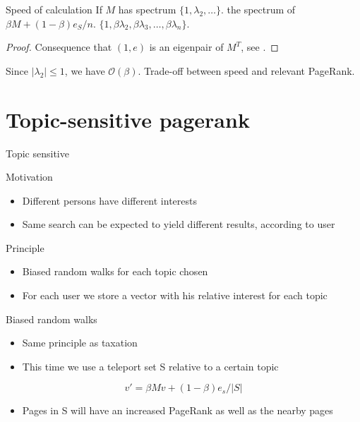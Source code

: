 \documentclass[10pt]{beamer}
\newcommand\bigoh{\mathcal{O}}
\begin{document}
\begin{frame}
  \begin{block}{Speed of calculation \cite[p.~12]{langville2004deeper}}
    If $M$ has spectrum $\{1,\lambda_2,\ldots\}$.
    the spectrum of $\beta M + (1-\beta)e_S/n$.
    $\{1,\beta\lambda_2,\beta\lambda_3,\ldots,\beta\lambda_n\}$.
    \begin{proof}
      Consequence that $(1,e)$ is an eigenpair of $M^T$,
      see \cite[p.~12]{langville2004deeper}.
    \end{proof}
  \end{block}
  Since $|\lambda_2| \leq 1$, we have $\bigoh(\beta)$.
  Trade-off between speed and relevant PageRank.
\end{frame}
\section{Topic-sensitive pagerank}
\begin{frame}[allowframebreaks]{Topic sensitive}
  \begin{block}{Motivation}
  \begin{itemize}
  \item Different persons have different interests
  \item Same search can be expected to yield different results, according to user
  \end{itemize}
  \end{block}
  \begin{block}{Principle}
  \begin{itemize}
  \item Biased random walks for each topic chosen
  \item For each user we store a vector with his relative interest for each topic
  \end{itemize}
  \end{block}
  \framebreak
  \begin{block}{Biased random walks}
    \begin{itemize}
      \item Same principle as taxation
      \item This time we use a teleport set S relative to a certain topic
    \end{itemize}
    $$ v' = \beta Mv + (1-\beta)e_s/|S|$$
    \begin{itemize}
    \item Pages in S will have an increased PageRank as well as the nearby pages
    \end{itemize}
  \end{block}
\end{frame}
\end{document}
